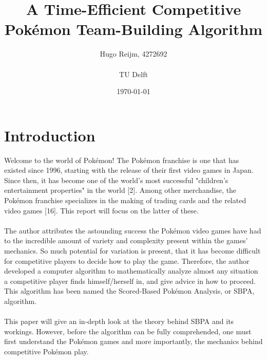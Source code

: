 \documentclass{article}
\title{A Time-Efficient Competitive Pok\'emon Team-Building Algorithm}
\author{Hugo Reijm, 4272692\\\\TU Delft}
\date{\today}
\begin{document}
\maketitle
\newpage
\tableofcontents

\newpage
\section{Introduction}
Welcome to the world of Pok\'emon! The Pok\'emon franchise is one that has existed since 1996, starting with the release of their first video games in Japan. Since then, it has become one of the world's most successful "children's entertainment properties" in the world [2]. Among other merchandise, the Pok\'emon franchise specializes in the making of trading cards and the related video games [16]. This report will focus on the latter of these.\\\\
The author attributes the astounding success the Pok\'emon video games have had to the incredible amount of variety and complexity present within the games' mechanics. So much potential for variation is present, that it has become difficult for competitive players to decide how to play the game. Therefore, the author developed a computer algorithm to mathematically analyze almost any situation a competitive player finds himself/herself in, and give advice in how to proceed. This algorithm has been named the Scored-Based Pok\'emon Analysis, or SBPA, algorithm.\\\\
This paper will give an in-depth look at the theory behind SBPA and its workings. However, before the algorithm can be fully comprehended, one must first understand the Pok\'emon games and more importantly, the mechanics behind competitive Pok\'emon play.
\end{document}
